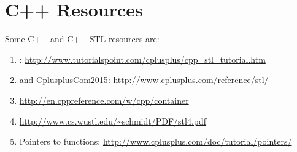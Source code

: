 









\chapter{C++ Resources}
\label{chp:CppResources}


Some {C++} and C++ STL resources are: \vspace{-0.3cm}
\begin{enumerate} \itemsep -4pt
\item \cite{Mohtashim2015a}: \url{http://www.tutorialspoint.com/cplusplus/cpp_stl_tutorial.htm}
\item \cite{CplusplusCom2014} and \url{CplusplusCom2015}: \url{http://www.cplusplus.com/reference/stl/}
\item \url{http://en.cppreference.com/w/cpp/container}
\item \url{http://www.cs.wustl.edu/~schmidt/PDF/stl4.pdf}
\item Pointers to functions: \url{http://www.cplusplus.com/doc/tutorial/pointers/}
\end{enumerate}



